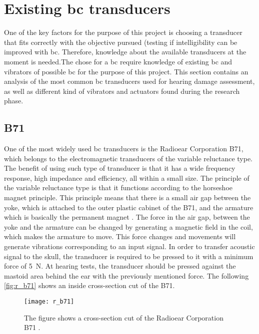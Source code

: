 \section{Existing \gls{bc} transducers}
One of the key factors for the purpose of this project is choosing a transducer that fits correctly with the objective pursued (testing if intelligibility can be improved with \gls{bc}. Therefore, knowledge about the available transducers at the moment is needed.The chose for a \gls{bc} require knowledge of existing \gls{bc} and vibrators of possible \gls{bc} for the purpose of this project. This section contains an analysis of the most common \gls{bc} transducers used for hearing damage assessment, as well as different kind of vibrators and actuators found during the research phase. 

\subsection{B71}
One of the most widely used \gls{bc} transducers is the Radioear Corporation B71, which belongs to the electromagnetic transducers of the variable reluctance type. The benefit of using such type of transducer is that it has a wide frequency response, high impedance and efficiency, all within a small size. The principle of the variable reluctance type is that it functions according to the horseshoe magnet principle. This principle means that there is a small air gap between the yoke, which is attached to the outer plastic cabinet of the B71, and the armature which is basically the permanent magnet \citep{the_balanced_2003}. The force in the air gap, between the yoke and the armature can be changed by generating a magnetic field in the coil, which makes the armature to move. This force changes and movements will generate vibrations corresponding to an input signal. In order to transfer acoustic signal to the skull, the transducer is required to be pressed to it with a minimum force of \SI{5}{\newton}. At hearing tests, the transducer should be pressed against the mastoid area behind the ear with the previously mentioned force. The following \autoref{fig:r_b71} shows an inside cross-section cut of the B71.

 \begin{figure}[H]
	\centering
		\texttt{[image: r\_b71]}
		\caption{The figure shows a cross-section cut of the Radioear Corporation B71  \citep{the_balanced_2003}.}
		\label{fig:r_b71}
\end{figure}

